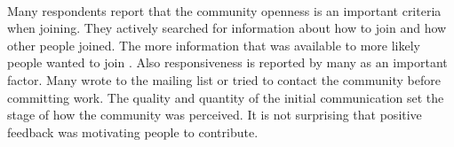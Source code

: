 \\
Many respondents report that the community openness is an important criteria when joining. They actively searched for information about how to join and how other people joined. The more information that was available to more likely people wanted to join . Also responsiveness is reported by many as an important factor. Many wrote to the mailing list or tried to contact the community before committing work. The quality and quantity of the initial communication set the stage of how the community was perceived. It is not surprising that positive feedback was motivating people to contribute.